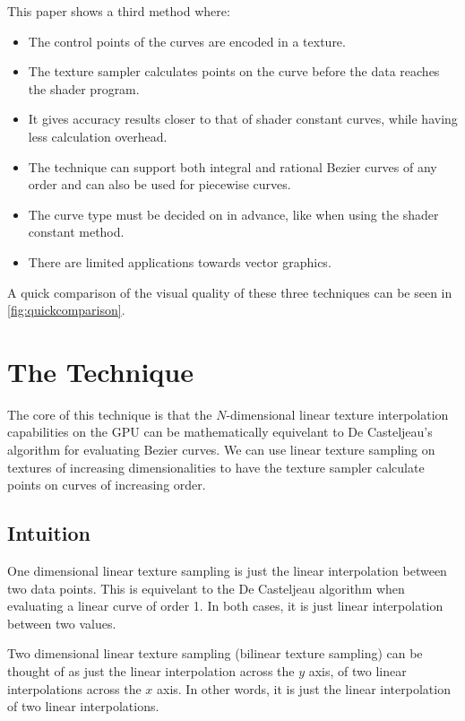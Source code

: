 \documentclass{jcgt}
\begin{document}
This paper shows a third method where:
\begin{itemize}
  \item The control points of the curves are encoded in a texture.
  \item The texture sampler calculates points on the curve before the data reaches the shader program.
  \item It gives accuracy results closer to that of shader constant curves, while having less calculation overhead.
  \item The technique can support both integral and rational Bezier curves of any order and can also be used for piecewise curves.
  \item The curve type must be decided on in advance, like when using the shader constant method.
  \item There are limited applications towards vector graphics.
\end{itemize}

A quick comparison of the visual quality of these three techniques can be seen in \autoref{fig:quickcomparison}.

\section{The Technique}
\label{sec:thetechnique}

The core of this technique is that the $N$-dimensional linear texture interpolation capabilities on the GPU can be mathematically equivelant to De Casteljeau's algorithm for evaluating Bezier curves.  We can use linear texture sampling on textures of increasing dimensionalities to have the texture sampler calculate points on curves of increasing order.

\subsection{Intuition}

One dimensional linear texture sampling is just the linear interpolation between two data points.  This is equivelant to the De Casteljeau algorithm when evaluating a linear curve of order 1.  In both cases, it is just linear interpolation between two values.

Two dimensional linear texture sampling (bilinear texture sampling) can be thought of as just the linear interpolation across the $y$ axis, of two linear interpolations across the $x$ axis.  In other words, it is just the linear interpolation of two linear interpolations.
\end{document}
